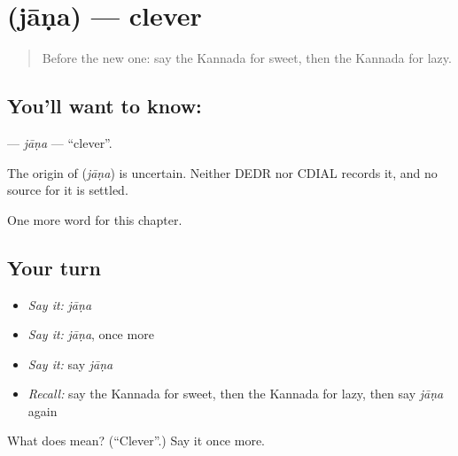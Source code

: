 \section[\texorpdfstring{\kn{ಜಾಣ} (jāṇa)}{ಜಾಣ (jāṇa)}]{ (jāṇa) — clever}

\label{lesson:KA-C145-jana}



\begin{quote}
Before the new one: say the Kannada for sweet, then the Kannada for lazy.
\end{quote}

\subsection*{You'll want to know: }
\textbf{} — \emph{jāṇa} — \textquotedblleft{}clever\textquotedblright{}.

\begin{cousinweb}
The origin of \textbf{} (\emph{jāṇa}) is uncertain. Neither DEDR nor CDIAL records it, and no source for it is settled.
\end{cousinweb}

\begin{grammarlens}[title={What you've built}]
One more word for this chapter.
\end{grammarlens}

\subsection*{Your turn}
\begin{itemize}
\raggedright
  \item \emph{Say it:} \emph{jāṇa}
  \item \emph{Say it:} \emph{jāṇa}, once more
  \item \emph{Say it:} say \emph{jāṇa}
  \item \emph{Recall:} say the Kannada for sweet, then the Kannada for lazy, then say \emph{jāṇa} again
\end{itemize}

\begin{tcolorbox}[breakable,colback=teal!4,colframe=teal!35!black,title={Before you move on}]
What does  mean? (\textquotedblleft{}Clever\textquotedblright{}.) Say it once more.
\end{tcolorbox}
